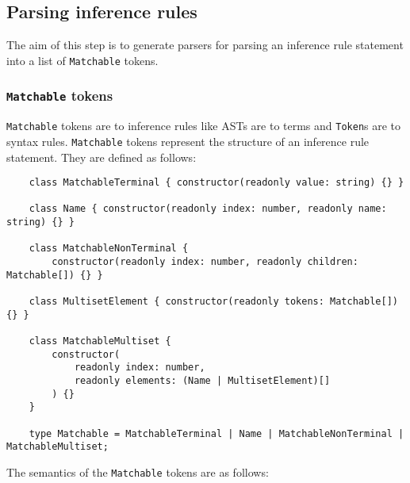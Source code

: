 \subsection{Parsing inference rules}
\label{inference:parsing}
The aim of this step is to generate parsers for parsing an inference rule statement into a list of \lstinline{Matchable} tokens.

\subsubsection{\texorpdfstring{\lstinline{Matchable}}{Matchable} tokens}
\lstinline{Matchable} tokens are to inference rules like ASTs are to terms and \lstinline{Token}s are to syntax rules. \lstinline{Matchable} tokens represent the structure of an inference rule statement. They are defined as follows:
\begin{lstlisting}
    class MatchableTerminal { constructor(readonly value: string) {} }

    class Name { constructor(readonly index: number, readonly name: string) {} }

    class MatchableNonTerminal {
        constructor(readonly index: number, readonly children: Matchable[]) {} }

    class MultisetElement { constructor(readonly tokens: Matchable[]) {} }

    class MatchableMultiset {
        constructor(
            readonly index: number,
            readonly elements: (Name | MultisetElement)[]
        ) {}
    }

    type Matchable = MatchableTerminal | Name | MatchableNonTerminal | MatchableMultiset;
\end{lstlisting}
The semantics of the \lstinline{Matchable} tokens are as follows:
